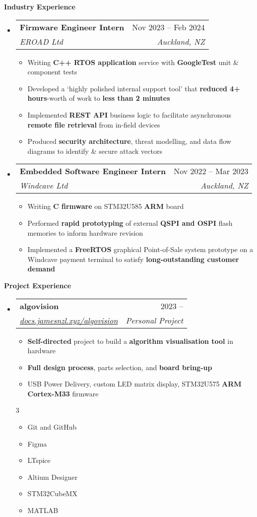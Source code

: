 \documentclass[11pt,a4paper]{article}[leftmargin=*]
\makeatletter
\def \entryspacing {-0pt}
\def \bulletstylei {\faAngleRight\hspace{-4.5pt}}
\def \bulletstyleii {\faCaretRight\hspace{-4.5pt}}
\renewcommand{\section}[2]{\vspace{5pt}
  \colorbox{secondary}{\color{white}\raggedbottom\normalsize\textbf{{#1}{\hspace{2pt}#2\hspace{4pt}}}}
}
\newcommand{\resumeEntryStart}{\begin{itemize}[leftmargin=2.5mm]}
\newcommand{\resumeEntryEnd}{\end{itemize}\vspace{\entryspacing}}
\newcommand{\resumeItemListStart}{\begin{itemize}[leftmargin=4.5mm]}
\newcommand{\resumeItemListEnd}{\end{itemize}}
\newcommand{\resumeItemListStartColumns}[2][-0.5]{\vspace*{#1\multicolsep}
\begin{multicols}{#2}\begin{itemize}[leftmargin=4.5mm]}
\newcommand{\resumeItemListEndColumns}[1][-1]{\end{itemize}\end{multicols}\vspace*{#1\multicolsep}}
\newcommand{\resumeItem}[2][\bulletstylei]{
  \item[\small#1]\small{
    {#2 \vspace{-2pt}}
  }
}
\newcommand{\resumeEntryTSDL}[4]{
  \vspace{-1pt}\item[]
    \begin{tabularx}{0.97\textwidth}{X@{\hspace{60pt}}r}
      \textbf{\color{primary}#1} & {\firabook\color{accent}\small#2} \\
      \textit{\color{accent}\small#3} & \textit{\color{accent}\small#4} \\
    \end{tabularx}\vspace{-6pt}
}
\newcommand{\resumeBf}[1]{\small\textbf{\color{halfbold}#1}}
\makeatother
\begin{document}

\section{\faBriefcase}{Industry Experience}

\resumeEntryStart
\resumeEntryTSDL
{Firmware Engineer Intern}{Nov 2023 -- Feb 2024}
{EROAD Ltd}{Auckland, NZ}

\resumeItemListStart
\resumeItem {Writing \resumeBf{C++ RTOS application} service with \resumeBf{GoogleTest} unit \& component tests}
\resumeItem {Developed a `highly polished internal support tool' that \resumeBf{reduced 4+ hours}-worth of work to \resumeBf{less than 2 minutes}}
\resumeItem {Implemented \resumeBf{REST API} business logic to facilitate asynchronous \resumeBf{remote file retrieval} from in-field devices}
\resumeItem {Produced \resumeBf{security architecture}, threat modelling, and data flow diagrams to identify \& secure attack vectors}
\resumeItemListEnd
\resumeEntryEnd

\resumeEntryStart
\resumeEntryTSDL
{Embedded Software Engineer Intern}{Nov 2022 -- Mar 2023}
{Windcave Ltd}{Auckland, NZ}

\resumeItemListStart
\resumeItem {Writing \resumeBf{C firmware} on STM32U585 \resumeBf{ARM} board}
\resumeItem {Performed \resumeBf{rapid prototyping} of external \resumeBf{QSPI and OSPI} flash memories to inform hardware revision}
\resumeItem {Implemented a \resumeBf{FreeRTOS} graphical Point-of-Sale system prototype on a Windcave payment terminal to satisfy \resumeBf{long-outstanding customer demand}}
\resumeItemListEnd
\resumeEntryEnd

\pagebreak


\section{\faFlask}{Project Experience}

\resumeEntryStart
\resumeEntryTSDL
{algovision}{2023 --}
{\href{https://docs.jamesnzl.xyz/algovision}{docs.jamesnzl.xyz/algovision}}{Personal Project}
\resumeItemListStart
\resumeItem {\resumeBf{Self-directed} project to build a \resumeBf{algorithm visualisation tool} in hardware}
\resumeItem {\resumeBf{Full design process}, parts selection, and \resumeBf{board bring-up}}
\resumeItem {USB Power Delivery, custom LED matrix display, STM32U575 \resumeBf{ARM Cortex-M33} firmware}
\resumeItemListEnd
\resumeItemListStartColumns{3}
\resumeItem[\bulletstyleii] {Git and GitHub}
\resumeItem[\bulletstyleii] {Figma}
\resumeItem[\bulletstyleii] {LTspice}
\resumeItem[\bulletstyleii] {Altium Designer}
\resumeItem[\bulletstyleii] {STM32CubeMX}
\resumeItem[\bulletstyleii] {MATLAB}
\resumeItemListEndColumns
\resumeEntryEnd
\end{document}
